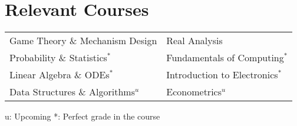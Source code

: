 \section*{\sc Relevant Courses}
\vspace{-2mm}
\hrulefill
\vspace{1mm}

\setlength{\tabcolsep}{0.20em}

\begin{tabular}{ l l }
Game Theory \& Mechanism Design & Real Analysis \\
Probability \& Statistics$^*$ & Fundamentals of Computing$^*$ \\
Linear Algebra \& ODEs$^*$  & Introduction to Electronics$^*$ \\
Data Structures \& Algorithms$^u$ & Econometrics$^u$ \\
\end{tabular}
\begin{small}
u: Upcoming \hspace{5mm}
*: Perfect grade in the course
\end{small}
